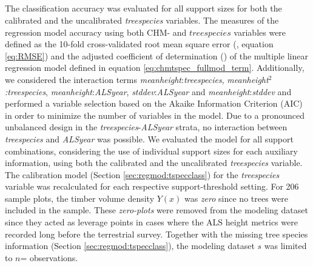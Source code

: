 \subsection{}
\label{sec:modval}

 The classification accuracy was evaluated for all support sizes for both the calibrated and the uncalibrated \textit{treespecies} variables. The measures of the regression model accuracy using both CHM- and $treespecies$ variables were defined as the 10-fold cross-validated root mean square error (\rmsecv{}, equation \ref{eq:RMSE}) and the adjusted coefficient of determination (\adjrsq{}) of the multiple linear regression model defined in equation \ref{eq:chmtspec_fullmod_term}. Additionally, we considered the interaction terms \textit{meanheight}:\textit{treespecies}, \textit{meanheight$^{2}$:treespecies}, \textit{meanheight}:\textit{ALSyear}, \textit{stddev}:\textit{ALSyear} and \textit{meanheight}:\textit{stddev} and performed a variable selection based on the Akaike Information Criterion (AIC) \citep{Akaike2011} in order to minimize the number of variables in the model. Due to a pronounced unbalanced design in the \textit{treespecies}-\textit{ALSyear} strata, no interaction between \textit{treespecies} and \textit{ALSyear} was possible. We evaluated the model for all support combinations, considering the use of individual support sizes for each auxiliary information, using both the calibrated and the uncalibrated \textit{treespecies} variable. The calibration model (Section \ref{sec:regmod:tspecclass}) for the \textit{treespecies} variable was recalculated for each respective support-threshold setting. For 206 sample plots, the timber volume density $Y(x)$ was \textit{zero} since no trees were included in the sample. These \textit{zero-plots} were removed from the modeling dataset since they acted as leverage points in cases where the ALS height metrics were recorded long before the terrestrial survey. Together with the missing tree species information (Section \ref{sec:regmod:tspecclass}), the modeling dataset $s$ was limited to $n$= observations.

